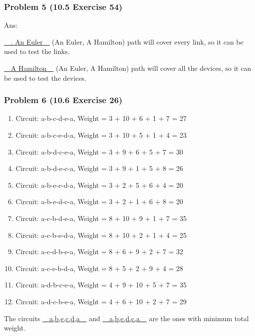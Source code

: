 \documentclass[12pt,hyperref={bookmarks=false}]{beamer}
\begin{document}
	\begin{frame}
	\frametitle{Problem 5 (10.5 Exercise 54)}
	\fontsize{10}{10pt}\selectfont

	\vspace*{0.3cm}
	Ans: \\
	\vspace*{0.3cm}

	\underline{~~. An Euler~~} (An Euler, A Hamilton) path will cover every link, so it can be used to test the links.\\

	\vspace*{0.3cm}

	\underline{~~A Hamilton~~} (An Euler, A Hamilton) path will cover all the devices, so it can be used to test the devices.
	
	\end{frame}
	
	\begin{frame}
	\frametitle{Problem 6 (10.6 Exercise 26)}
	\fontsize{9}{9pt}\selectfont

	\begin{enumerate}[label=(\alph*)]
	\setlength\itemsep{0.2em}
	\item Circuit: a-b-c-d-e-a, Weight = 3 + 10 + 6 + 1 + 7 = 27
	\item Circuit: a-b-c-e-d-a, Weight = 3 + 10 + 5 + 1 + 4 = 23
	\item Circuit: a-b-d-c-e-a, Weight = 3 + 9 + 6 + 5 + 7 = 30
	\item Circuit: a-b-d-e-c-a, Weight = 3 + 9 + 1 + 5 + 8 = 26

	
	\item Circuit: a-b-e-c-d-a, Weight = 3 + 2 + 5 + 6 + 4 = 20
	\item Circuit: a-b-e-d-c-a, Weight = 3  + 2 + 1 + 6 + 8 = 20
	\item Circuit: a-c-b-d-e-a, Weight = 8 + 10 + 9 + 1 + 7 = 35
	\item Circuit: a-c-b-e-d-a, Weight = 8 + 10 + 2 + 1 + 4 = 25
	
	\item Circuit: a-c-d-b-e-a, Weight = 8 + 6 + 9 + 2 + 7 = 32
	\item Circuit: a-c-e-b-d-a, Weight = 8 + 5 + 2 + 9 + 4 = 28
	\item Circuit: a-d-b-c-e-a, Weight = 4 + 9 + 10 + 5 + 7 = 35
	\item Circuit: a-d-c-b-e-a, Weight = 4 + 6 + 10 + 2 + 7 = 29
	\end{enumerate}
	The circuits \underline{~~a,b,e,c,d,a~~} and \underline{~~a,b,e,d,c,a~~} are the ones with minimum total weight.
	\end{frame}
\end{document}
